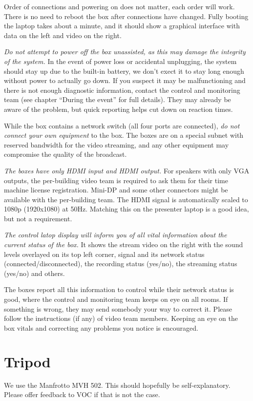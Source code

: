 \documentclass{article}
\begin{document}
Order of connections and powering on does not matter, each order will work. There is no need to reboot the box after connections have changed.
Fully booting the laptop takes about a minute, and it should show a graphical interface with data on the left and video on the right.

\emph{Do not attempt to power off the box unassisted, as this may damage the integrity of the system.}
In the event of power loss or accidental unplugging, the system should stay up due to the built-in battery, we don't exect it to stay long enough without power to actually go down. If you suspect it may be malfunctioning and there is not enough diagnostic information, contact the control and monitoring team (see chapter ``During the event'' for full details). They may already be aware of the problem, but quick reporting helps cut down on reaction times.

While the box contains a network switch (all four ports are connected), \emph{do not connect your own equipment} to the box. The boxes are on a special subnet with reserved bandwidth for the video streaming, and any other equipment may compromise the quality of the broadcast.

\emph{The boxes have only HDMI input and HDMI output.}
For speakers with only VGA outputs, the per-building video team is required to ask them for their time machine license registration. Mini-DP and some other connectors might be available with the per-building team.
The HDMI signal is automatically scaled to 1080p (1920x1080) at 50Hz. Matching this on the presenter laptop is a good idea, but not a requirement.

\emph{The control latop display will inform you of all vital information about the current status of the box.} It shows the stream video on the right with the sound levels overlayed on its top left corner, signal and its network status (connected/disconnected), the recording status (yes/no), the streaming status (yes/no) and others.

The boxes report all this information to control while their network status is good, where the control and monitoring team keeps on eye on all rooms. If something is wrong, they may send somebody your way to correct it. Please follow the instructions (if any) of video team members. Keeping an eye on the box vitals and correcting any problems you notice is encouraged.

\section{Tripod}
We use the Manfrotto MVH 502. This should hopefully be self-explanatory. Please offer feedback to VOC if that is not the case.
\end{document}
